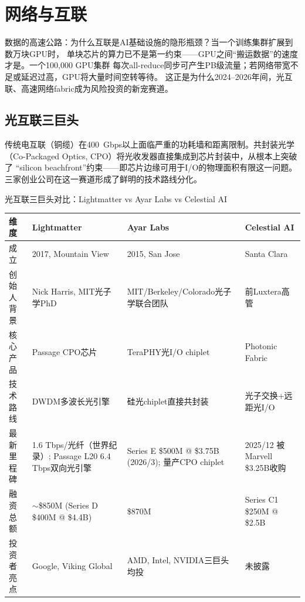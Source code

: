 
\section{网络与互联}
\label{sec:infra-networking}

数据的高速公路：为什么互联是AI基础设施的隐形瓶颈？当一个训练集群扩展到数万块GPU时，
单块芯片的算力已不是第一约束——GPU之间``搬运数据''的速度才是。一个100,000 GPU集群
每次all-reduce同步可产生PB级流量；若网络带宽不足或延迟过高，GPU将大量时间空转等待。
这正是为什么2024--2026年间，光互联、高速网络fabric成为风险投资的新宠赛道。

\subsection{光互联三巨头}

传统电互联（铜缆）在400~Gbps以上面临严重的功耗墙和距离限制。共封装光学
（Co-Packaged Optics, CPO）将光收发器直接集成到芯片封装中，从根本上突破了
``silicon beachfront''约束——即芯片边缘可用于I/O的物理面积有限这一问题。
三家创业公司在这一赛道形成了鲜明的技术路线分化。

\begin{corebox}{光互联三巨头对比：Lightmatter vs Ayar Labs vs Celestial AI}
\begin{tabularx}{\textwidth}{l X X X}
\toprule
\rowcolor{figLightGray}
\textbf{维度} & \textbf{Lightmatter} & \textbf{Ayar Labs} & \textbf{Celestial AI} \\
\midrule
成立 & 2017, Mountain View & 2015, San Jose & Santa Clara \\
创始人背景 & Nick Harris, MIT光子学PhD & MIT/Berkeley/Colorado光子学联合团队 & 前Luxtera高管 \\
核心产品 & Passage CPO芯片 & TeraPHY光I/O chiplet & Photonic Fabric \\
技术路线 & DWDM多波长光引擎 & 硅光chiplet直接共封装 & 光子交换+远距光I/O \\
最新里程碑 & 1.6 Tbps/光纤（世界纪录）; Passage L20 6.4 Tbps双向光引擎 & Series E \$500M @ \$3.75B (2026/3); 量产CPO chiplet & 2025/12 被Marvell \$3.25B收购 \\
融资总额 & $\sim$\$850M (Series D \$400M @ \$4.4B) & \$870M & Series C1 \$250M @ \$2.5B \\
投资者亮点 & Google, Viking Global & AMD, Intel, NVIDIA三巨头均投 & 未披露 \\
\bottomrule
\end{tabularx}
\end{corebox}

